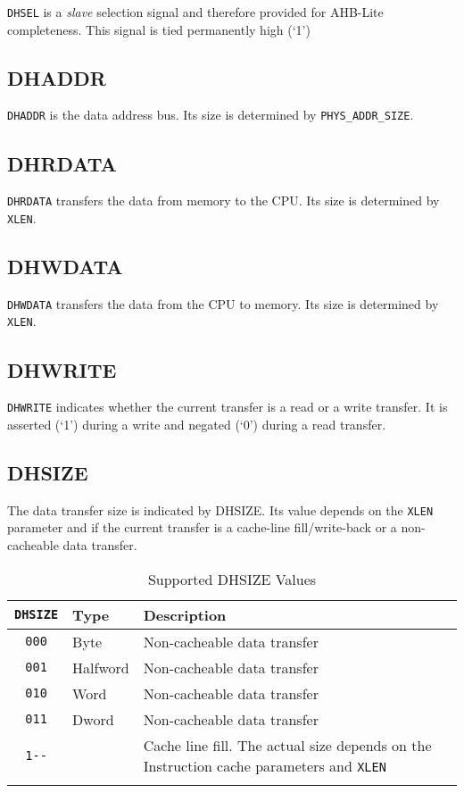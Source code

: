 \texttt{DHSEL} is a \emph{slave} selection signal and therefore provided for AHB-Lite
completeness. This signal is tied permanently high (`1')

\subsection{DHADDR}\label{dhaddr}

\texttt{DHADDR} is the data address bus. Its size is determined by
\texttt{PHYS\_ADDR\_SIZE}.

\subsection{DHRDATA}\label{dhrdata}

\texttt{DHRDATA} transfers the data from memory to the CPU. Its size is
determined by \texttt{XLEN}.

\subsection{DHWDATA}\label{dhwdata}

\texttt{DHWDATA} transfers the data from the CPU to memory. Its size is
determined by \texttt{XLEN}.

\subsection{DHWRITE}\label{dhwrite}

\texttt{DHWRITE} indicates whether the current transfer is a read or a write
transfer. It is asserted (`1') during a write and negated (`0') during a
read transfer.

\subsection{DHSIZE}\label{dhsize}

The data transfer size is indicated by DHSIZE. Its value depends on the
\texttt{XLEN} parameter and if the current transfer is a cache-line
fill/write-back or a non-cacheable data transfer.

\begin{longtable}[]{@{}clp{7.5cm}@{}}
\toprule
{\tt DHSIZE} & Type & Description\tabularnewline
\midrule
\endhead
\texttt{000}   & Byte     & Non-cacheable data transfer\tabularnewline
\texttt{001}   & Halfword & Non-cacheable data transfer\tabularnewline
\texttt{010}   & Word     & Non-cacheable data transfer\tabularnewline
\texttt{011}   & Dword    & Non-cacheable data transfer\tabularnewline
\texttt{1-\/-} &          & Cache line fill. The actual size depends on the Instruction cache parameters and \texttt{XLEN}\tabularnewline
\bottomrule
\caption{Supported DHSIZE Values}
\label{tab:dhsize-values}
\end{longtable}

